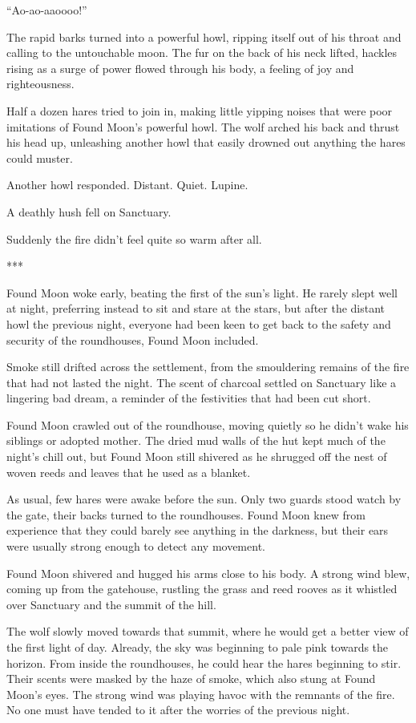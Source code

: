 ``Ao-ao-aaoooo!''

The rapid barks turned into a powerful howl, ripping itself out of his throat and calling to the untouchable moon. The fur on the back of his neck lifted, hackles rising as a surge of power flowed through his body, a feeling of joy and righteousness.

Half a dozen hares tried to join in, making little yipping noises that were poor imitations of Found Moon's powerful howl. The wolf arched his back and thrust his head up, unleashing another howl that easily drowned out anything the hares could muster.

Another howl responded. Distant. Quiet. Lupine.

A deathly hush fell on Sanctuary.

Suddenly the fire didn't feel quite so warm after all.

***

Found Moon woke early, beating the first of the sun's light. He rarely slept well at night, preferring instead to sit and stare at the stars, but after the distant howl the previous night, everyone had been keen to get back to the safety and security of the roundhouses, Found Moon included.

Smoke still drifted across the settlement, from the smouldering remains of the fire that had not lasted the night. The scent of charcoal settled on Sanctuary like a lingering bad dream, a reminder of the festivities that had been cut short.

Found Moon crawled out of the roundhouse, moving quietly so he didn't wake his siblings or adopted mother. The dried mud walls of the hut kept much of the night's chill out, but Found Moon still shivered as he shrugged off the nest of woven reeds and leaves that he used as a blanket.

As usual, few hares were awake before the sun. Only two guards stood watch by the gate, their backs turned to the roundhouses. Found Moon knew from experience that they could barely see anything in the darkness, but their ears were usually strong enough to detect any movement.

Found Moon shivered and hugged his arms close to his body. A strong wind blew, coming up from the gatehouse, rustling the grass and reed rooves as it whistled over Sanctuary and the summit of the hill.

The wolf slowly moved towards that summit, where he would get a better view of the first light of day. Already, the sky was beginning to pale pink towards the horizon. From inside the roundhouses, he could hear the hares beginning to stir. Their scents were masked by the haze of smoke, which also stung at Found Moon's eyes. The strong wind was playing havoc with the remnants of the fire. No one must have tended to it after the worries of the previous night.


